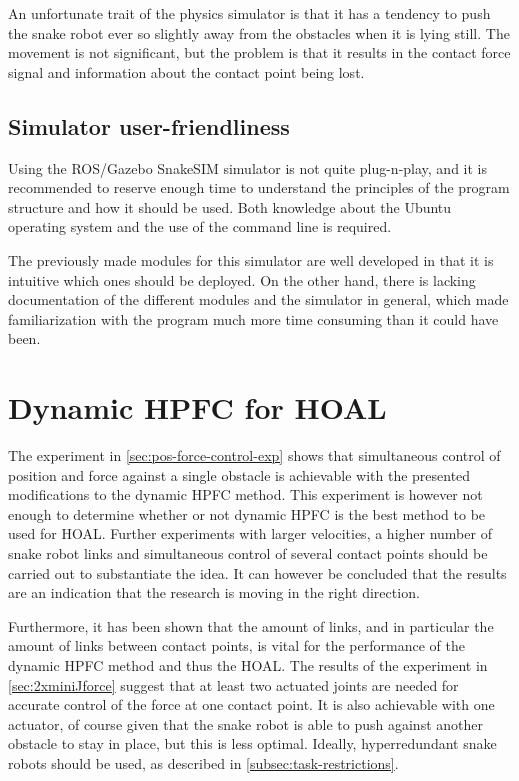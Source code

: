 An unfortunate trait of the physics simulator is that it has a tendency to push the snake robot ever so slightly away from the obstacles when it is lying still. The movement is not significant, but the problem is that it results in the contact force signal and information about the contact point being lost.

\subsection{Simulator user-friendliness}

Using the ROS/Gazebo SnakeSIM simulator is not quite plug-n-play, and it is recommended to reserve enough time to understand the principles of the program structure and how it should be used. Both knowledge about the Ubuntu operating system and the use of the command line is required.

The previously made modules for this simulator are well developed in that it is intuitive which ones should be deployed. On the other hand, there is lacking documentation of the different modules and the simulator in general, which made familiarization with the program much more time consuming than it could have been.

\section{Dynamic HPFC for HOAL}

The experiment in \ref{sec:pos-force-control-exp} shows that simultaneous control of position and force against a single obstacle is achievable with the presented modifications to the dynamic HPFC method. This experiment is however not enough to determine whether or not dynamic HPFC is the best method to be used for HOAL. Further experiments with larger velocities, a higher number of snake robot links and simultaneous control of several contact points should be carried out to substantiate the idea. It can however be concluded that the results are an indication that the research is moving in the right direction.

Furthermore, it has been shown that the amount of links, and in particular the amount of links between contact points, is vital for the performance of the dynamic HPFC method and thus the HOAL. The results of the experiment in \ref{sec:2xminiJforce} suggest that at least two actuated joints are needed for accurate control of the force at one contact point. It is also achievable with one actuator, of course given that the snake robot is able to push against another obstacle to stay in place, but this is less optimal. Ideally, hyperredundant snake robots should be used, as described in \ref{subsec:task-restrictions}.

